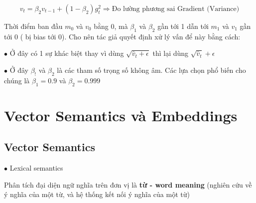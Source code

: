 \documentclass[final,letterpaper,twoside,12pt]{report}
\begin{document}
$$v_t = \beta_2 v_{t-1} + (1 - \beta_2) g^2_t\Longrightarrow \text{Đo lường phương sai Gradient (Variance)}$$

Thời điểm ban đầu $m_0$ và $v_0$ bằng 0, mà $\beta_1$ và $\beta_2$ gần tới 1 dẫn tới $m_1$ và $v_1$ gần tới 0 ( bị bias tới 0). Cho nên tác giả quyết định xử lý vấn để này bằng cách:

\begin{center}
\end{center}

$\bullet$ Ở đây có 1 sự khác biệt thay vì dùng ${\sqrt{\hat{v}_t+\epsilon}}$ thì lại dùng ${\sqrt{\hat{v}_t}+\epsilon}$

$\bullet$ Ở đây  $\beta_!$ và  $\beta_2$ là các tham số trọng số không âm. Các lựa chọn phổ biến cho chúng là  $\beta_1=0.9$ và $\beta_2 = 0.999$


\chapter{Vector Semantics và Embeddings}

\section{Vector Semantics}

$\bullet$ Lexical semantics

Phân tích đại diện ngữ nghĩa trên đơn vị là \textbf{từ - word meaning} (nghiên cứu về ý nghĩa của một từ, và hệ thống kết nối ý nghĩa của một từ)
\end{document}
